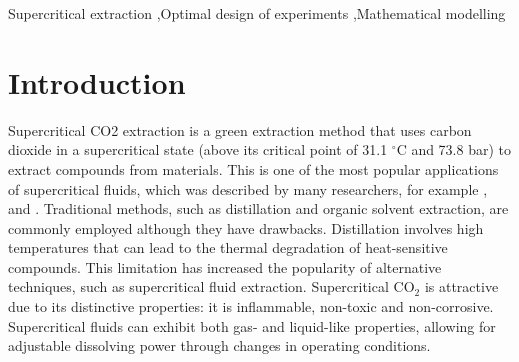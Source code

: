 \documentclass[a4paper,fleqn]{cas-dc}
\begin{document}
\begin{keywords}
	Supercritical extraction \sep Optimal design of experiments \sep Mathematical modelling
\end{keywords}

\maketitle


\section{Introduction}
\linenumbers
%
Supercritical CO2 extraction is a green extraction method that uses carbon dioxide in a supercritical state (above its critical point of 31.1 $^\circ$C and 73.8 bar) to extract compounds from materials. This is one of the most popular applications of supercritical fluids, which was described by many researchers, for example \citet{Sodeifian2017}, \citet{Reverchon1993} and \citet{Sovova1994}. Traditional methods, such as distillation and organic solvent extraction, are commonly employed although they have drawbacks. Distillation involves high temperatures that can lead to the thermal degradation of heat-sensitive compounds. This limitation has increased the popularity of alternative techniques, such as supercritical fluid extraction. Supercritical CO$_2$ is attractive due to its distinctive properties: it is inflammable, non-toxic and non-corrosive. Supercritical fluids can exhibit both gas- and liquid-like properties, allowing for adjustable dissolving power through changes in operating conditions.
\end{document}
